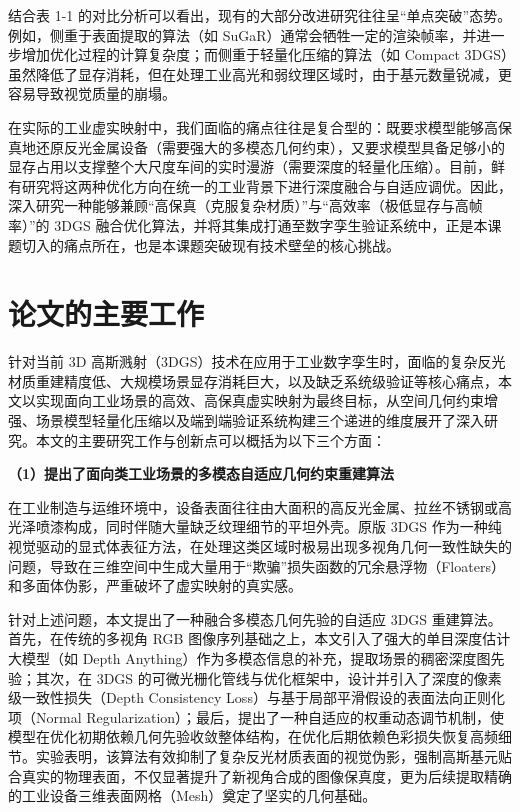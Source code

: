结合表 1-1 的对比分析可以看出，现有的大部分改进研究往往呈“单点突破”态势。例如，侧重于表面提取的算法（如 SuGaR）通常会牺牲一定的渲染帧率，并进一步增加优化过程的计算复杂度；而侧重于轻量化压缩的算法（如 Compact 3DGS）虽然降低了显存消耗，但在处理工业高光和弱纹理区域时，由于基元数量锐减，更容易导致视觉质量的崩塌。

在实际的工业虚实映射中，我们面临的痛点往往是复合型的：既要求模型能够高保真地还原反光金属设备（需要强大的多模态几何约束），又要求模型具备足够小的显存占用以支撑整个大尺度车间的实时漫游（需要深度的轻量化压缩）。目前，鲜有研究将这两种优化方向在统一的工业背景下进行深度融合与自适应调优。因此，深入研究一种能够兼顾“高保真（克服复杂材质）”与“高效率（极低显存与高帧率）”的 3DGS 融合优化算法，并将其集成打通至数字孪生验证系统中，正是本课题切入的痛点所在，也是本课题突破现有技术壁垒的核心挑战。


\section{论文的主要工作}

针对当前 3D 高斯溅射（3DGS）技术在应用于工业数字孪生时，面临的复杂反光材质重建精度低、大规模场景显存消耗巨大，以及缺乏系统级验证等核心痛点，本文以实现面向工业场景的高效、高保真虚实映射为最终目标，从空间几何约束增强、场景模型轻量化压缩以及端到端验证系统构建三个递进的维度展开了深入研究。本文的主要研究工作与创新点可以概括为以下三个方面：

\textbf{（1）提出了面向类工业场景的多模态自适应几何约束重建算法}

在工业制造与运维环境中，设备表面往往由大面积的高反光金属、拉丝不锈钢或高光泽喷漆构成，同时伴随大量缺乏纹理细节的平坦外壳。原版 3DGS 作为一种纯视觉驱动的显式体表征方法，在处理这类区域时极易出现多视角几何一致性缺失的问题，导致在三维空间中生成大量用于“欺骗”损失函数的冗余悬浮物（Floaters）和多面体伪影，严重破坏了虚实映射的真实感。

针对上述问题，本文提出了一种融合多模态几何先验的自适应 3DGS 重建算法。首先，在传统的多视角 RGB 图像序列基础之上，本文引入了强大的单目深度估计大模型（如 Depth Anything\cite{yang2024depthanything}）作为多模态信息的补充，提取场景的稠密深度图先验；其次，在 3DGS 的可微光栅化管线与优化框架中，设计并引入了深度的像素级一致性损失（Depth Consistency Loss）与基于局部平滑假设的表面法向正则化项（Normal Regularization）；最后，提出了一种自适应的权重动态调节机制，使模型在优化初期依赖几何先验收敛整体结构，在优化后期依赖色彩损失恢复高频细节。实验表明，该算法有效抑制了复杂反光材质表面的视觉伪影，强制高斯基元贴合真实的物理表面，不仅显著提升了新视角合成的图像保真度，更为后续提取精确的工业设备三维表面网格（Mesh）奠定了坚实的几何基础。

